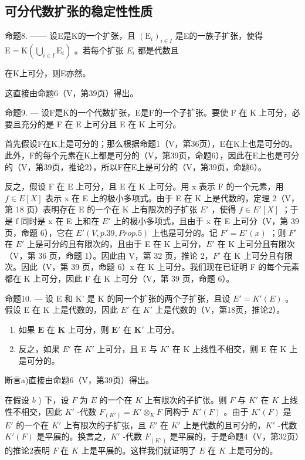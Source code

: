 \subsection{可分代数扩张的稳定性性质}

命题8. —— 设E是K的一个扩张，且 \((\mathrm{E}_{i})_{i\in I}\) 是E的一族子扩张，使得 \(\mathrm{E}=\mathrm{K}\left(\bigcup_{i\in I}\mathrm{E}_{i}\right)\) 。若每个扩张 \(E_{i}\) 都是代数且

在K上可分，则E亦然。

这直接由命题6（V，第39页）得出。

命题9. --- 设F是K的一个代数扩张，E是F的一个子扩张。要使 F 在 K 上可分，必要且充分的是 F 在 E 上可分且 E 在 K 上可分。

首先假设F在K上是可分的；那么根据命题1（V，第36页），E在K上也是可分的。此外，F的每个元素在K上都是可分的（V，第39页，命题6），因此在E上也是可分的（V，第39页，推论2），所以F在E上是可分的（V，第39页，命题6）。

反之，假设 F 在 E 上可分，且 E 在 K 上可分。用 x 表示 F 的一个元素，用 \(f \in E[X]\) 表示 x 在 E 上的极小多项式。由于 E 在 K 上是代数的，定理 2（V，第 18 页）表明存在 E 的一个在 K 上有限次的子扩张 \(E'\) ，使得 \(f \in E'[X]\) ；于是 f 同时是 x 在 E 上和在 \(E'\) 上的极小多项式，且由于 x 在 E 上可分（V，第 39 页，命题 6），它在 \(E'(V, p. 39, Prop. 5)\) 上也是可分的。记 \(F' = E'(x)\) ；则 \(F'\) 在 \(E'\) 上是可分的且有限次的，且由于 E 在 K 上可分，\(E'\) 在 K 上可分且有限次（V，第 36 页，命题 1）。因此由 V，第 32 页，推论 2，\(F'\) 在 K 上可分且有限次。因此（V，第 39 页，命题 6）x 在 K 上可分。我们现在已证明 F 的每个元素都在 K 上可分，因此 F 在 K 上可分（V，第 39 页，命题 6）。

命题10. --- 设 E 和 K' 是 K 的同一个扩张的两个子扩张，且设 \(E' = K'(E)\) 。假设 E 在 K 上是代数的，因此 \(E'\) 在 \(K'\) 上是代数的（V，第18页，推论2）。

\begin{enumerate}
\def\labelenumi{\alph{enumi})}
\item
  如果 \(\mathbf{E}\) 在 \(\mathbf{K}\) 上可分，则 \(\mathbf{E}'\) 在 \(\mathbf{K}'\) 上可分。
\item
  反之，如果 \(E'\) 在 \(K'\) 上可分，且 E 与 \(K'\) 在 K 上线性不相交，则 E 在 K 上是可分的。
\end{enumerate}

断言a)直接由命题6（V，第39页）得出。

在假设 \(b\) ) 下，设 \(F\) 为 \(E\) 的一个在 \(K\) 上有限次的子扩张。则 \(F\) 与 \(K'\) 在 \(K\) 上线性不相交，因此 \(K'\) -代数 \(F_{(K')} = K' \otimes_K F\) 同构于 \(K'(F)\) 。由于 \(K'(F)\) 是 \(E'\) 的一个在 \(K'\) 上有限次的子扩张，且 \(E'\) 在 \(K'\) 上是代数的且可分的，\(K'\) -代数 \(K'(F)\) 是平展的。换言之，\(K'\) -代数 \(F_{(K')}\) 是平展的，于是命题4（V，第32页）的推论2表明 \(F\) 在 \(K\) 上是平展的。这样我们就证明了 \(E\) 在 \(K\) 上是可分的。
\relax{}
